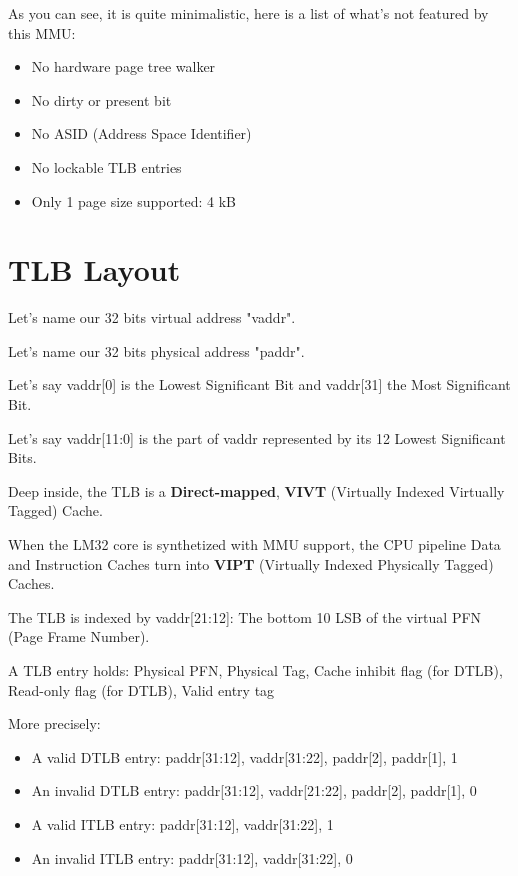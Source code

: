 \documentclass[a4paper,11pt]{article}
\begin{document}
As you can see, it is quite minimalistic, here is a list of what's not featured by this MMU:

\begin{itemize}
	\item No hardware page tree walker
	\item No dirty or present bit
	\item No ASID (Address Space Identifier)
	\item No lockable TLB entries
	\item Only 1 page size supported: 4 kB
\end{itemize}

\section{TLB Layout}

Let's name our 32 bits virtual address "vaddr".

Let's name our 32 bits physical address "paddr".

Let's say vaddr[0] is the Lowest Significant Bit and vaddr[31] the Most Significant Bit.

Let's say vaddr[11:0] is the part of vaddr represented by its 12 Lowest Significant Bits.
\newline

Deep inside, the TLB is a \textbf{Direct-mapped}, \textbf{VIVT} (Virtually Indexed Virtually Tagged) Cache.
\newline

When the LM32 core is synthetized with MMU support, the CPU pipeline Data and Instruction Caches turn into \textbf{VIPT} (Virtually Indexed Physically Tagged) Caches.
\newline

The TLB is indexed by vaddr[21:12]: The bottom 10 LSB of the virtual PFN (Page Frame Number).
\newline

A TLB entry holds: Physical PFN, Physical Tag, Cache inhibit flag (for DTLB), Read-only flag (for DTLB), Valid entry tag
\newline

More precisely:

\begin{itemize}
	\item A valid DTLB entry: paddr[31:12], vaddr[31:22], paddr[2], paddr[1], 1
	\item An invalid DTLB entry: paddr[31:12], vaddr[21:22], paddr[2], paddr[1], 0
	\item A valid ITLB entry: paddr[31:12], vaddr[31:22], 1
	\item An invalid ITLB entry: paddr[31:12], vaddr[31:22], 0
\end{itemize}
\end{document}

